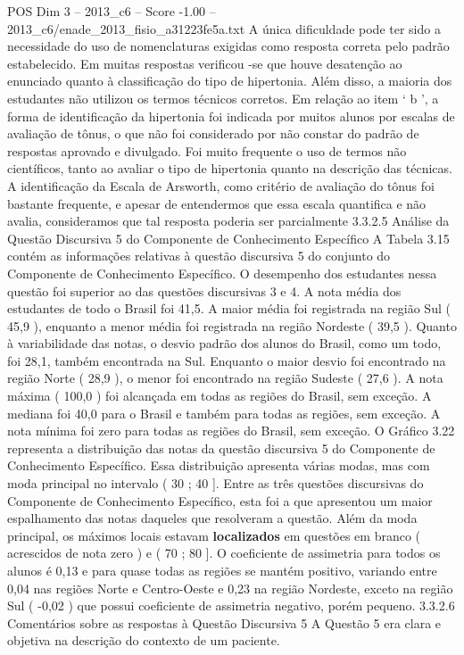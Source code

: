 \begin{textsample}{POS Dim 3 – 2013\_c6 – Score -1.00 – 2013\_c6/enade\_2013\_fisio\_a31223fe5a.txt}
A única dificuldade pode ter sido a necessidade do uso de nomenclaturas exigidas como resposta correta pelo padrão estabelecido.
Em muitas respostas verificou -se que houve desatenção ao enunciado quanto à classificação do tipo de hipertonia.
Além disso, a maioria dos estudantes não utilizou os termos técnicos corretos.
Em relação ao item ‘ b ’, a forma de identificação da hipertonia foi indicada por muitos alunos por escalas de avaliação de tônus, o que não foi considerado por não constar do padrão de respostas aprovado e divulgado.
Foi muito frequente o uso de termos não científicos, tanto ao avaliar o tipo de hipertonia quanto na descrição das técnicas.
A identificação da Escala de Arsworth, como critério de avaliação do tônus foi bastante frequente, e apesar de entendermos que essa escala quantifica e não avalia, consideramos que tal resposta poderia ser parcialmente 3.3.2.5 Análise da Questão Discursiva 5 do Componente de Conhecimento Específico A Tabela 3.15 contém as informações relativas à questão discursiva 5 do conjunto do Componente de Conhecimento Específico.
O desempenho dos estudantes nessa questão foi superior ao das questões discursivas 3 e 4.
A nota média dos estudantes de todo o Brasil foi 41,5.
A maior média foi registrada na região Sul ( 45,9 ), enquanto a menor média foi registrada na região Nordeste ( 39,5 ).
Quanto à variabilidade das notas, o desvio padrão dos alunos do Brasil, como um todo, foi 28,1, também encontrada na Sul.
Enquanto o maior desvio foi encontrado na região Norte ( 28,9 ), o menor foi encontrado na região Sudeste ( 27,6 ).
A nota máxima ( 100,0 ) foi alcançada em todas as regiões do Brasil, sem exceção.
A mediana foi 40,0 para o Brasil e também para todas as regiões, sem exceção.
A nota mínima foi zero para todas as regiões do Brasil, sem exceção.
O Gráfico 3.22 representa a distribuição das notas da questão discursiva 5 do Componente de Conhecimento Específico.
Essa distribuição apresenta várias modas, mas com moda principal no intervalo ( 30 ; 40 ].
Entre as três questões discursivas do Componente de Conhecimento Específico, esta foi a que apresentou um maior espalhamento das notas daqueles que resolveram a questão.
Além da moda principal, os máximos locais estavam \textbf{localizados} em questões em branco ( acrescidos de nota zero ) e ( 70 ; 80 ].
O coeficiente de assimetria para todos os alunos é 0,13 e para quase todas as regiões se mantém positivo, variando entre 0,04 nas regiões Norte e Centro-Oeste e 0,23 na região Nordeste, exceto na região Sul ( -0,02 ) que possui coeficiente de assimetria negativo, porém pequeno. 3.3.2.6 Comentários sobre as respostas à Questão Discursiva 5 A Questão 5 era clara e objetiva na descrição do contexto de um paciente.

\end{textsample}
